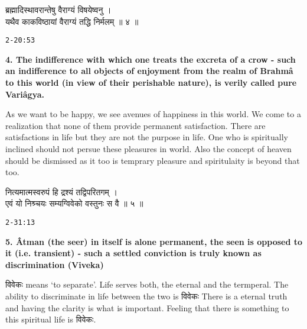 \documentclass{article}
\begin{document}
\begin{large}
\begin{center}
    \begin{hindi}
	ब्रह्मादिस्थावरान्तेषु वैराग्यं विषयेष्वनु ।\\
	यथैव काकविष्ठायां वैराग्यं तद्धि निर्मलम् ॥ ४ ॥
    \end{hindi}
\end{center}
\end{large}
\texttt{2-20:53}

\textbf{4. The indifference with which one treats the excreta of a crow - such an
indifference to all objects of enjoyment from the realm of Brahmâ to this
world (in view of their perishable nature), is verily called pure Variâgya.
}

\smallskip

\begin{oframed}
As we want to be happy, we see avenues of happiness in this world. We come to a
realization that none of them provide permanent satisfaction. There are
satisfactions in life but they are not the purpose in life. One who is
spiritually inclined should not persue these pleasures in world. Also the
concept of heaven should be dismissed as it too is temprary pleasure and
spiritulaity is beyond that too.
\end{oframed}




\begin{large}
\begin{center}
    \begin{hindi}
	नित्यमात्मस्वरुपं हि द्रश्यं तद्विपरितगम् ।\\
	एवं यो निश्र्चयः सम्यग्विवेको वस्तुनः स वै ॥ ५ ॥
    \end{hindi}
\end{center}
\end{large}
\texttt{2-31:13}

\textbf{5. Âtman (the seer) in itself is alone permanent, the seen is opposed
to it (i.e. transient) - such a settled conviction is truly known as discrimination (Viveka)
}

\begin{oframed}
\texthindi{विवेकः}
means `to separate'.  Life serves both, the eternal and the termperal.
The ability to discriminate in life between the two is
\texthindi{विवेकः}
There is a eternal truth and having the clarity is what is important. Feeling
that there is something to this spiritual life is 
\texthindi{विवेकः}.
\end{oframed}
\end{document}

